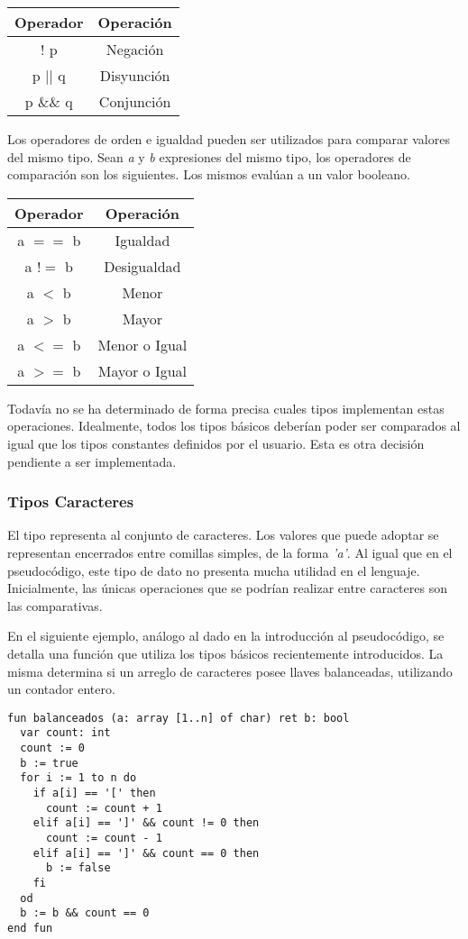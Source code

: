 \documentclass{article}
\begin{document}
\begin{center}
\begin{tabular}{| c | c |}
\hline
     Operador & Operación \\
     \hline
     $!$ p      & Negación \\
     p $||$ q   & Disyunción \\
     p $\&\&$ q & Conjunción \\
\hline
\end{tabular}
\end{center}

Los operadores de orden e igualdad pueden ser utilizados para comparar valores del mismo tipo.
Sean \textit{a} y \textit{b} expresiones del mismo tipo, los operadores de comparación son los siguientes.
Los mismos evalúan a un valor booleano.

\begin{center}
\begin{tabular}{| c | c |}
\hline
    Operador & Operación \\
    \hline
    a $==$ b  & Igualdad \\
    a $!=$ b  & Desigualdad \\
    a $<$ b   & Menor \\
    a $>$ b   & Mayor \\
    a $<=$ b  & Menor o Igual \\
    a $>=$ b  & Mayor o Igual \\
\hline
\end{tabular}
\end{center}

Todavía no se ha determinado de forma precisa cuales tipos implementan estas operaciones.
Idealmente, todos los tipos básicos deberían poder ser comparados al igual que los tipos constantes definidos por el usuario.
Esta es otra decisión pendiente a ser implementada.

\subsubsection{Tipos Caracteres}

El tipo  representa al conjunto de caracteres.
Los valores que puede adoptar se representan encerrados entre comillas simples, de la forma \textit{'a'}.
Al igual que en el pseudocódigo, este tipo de dato no presenta mucha utilidad en el lenguaje.
Inicialmente, las únicas operaciones que se podrían realizar entre caracteres son las comparativas.

En el siguiente ejemplo, análogo al dado en la introducción al pseudocódigo, se detalla una función que utiliza los tipos básicos recientemente introducidos.
La misma determina si un arreglo de caracteres posee llaves balanceadas, utilizando un contador entero.
\begin{lstlisting}
fun balanceados (a: array [1..n] of char) ret b: bool
  var count: int
  count := 0
  b := true
  for i := 1 to n do
    if a[i] == '[' then
      count := count + 1
    elif a[i] == ']' && count != 0 then
      count := count - 1
    elif a[i] == ']' && count == 0 then
      b := false
    fi
  od
  b := b && count == 0
end fun

\end{lstlisting}
\end{document}

